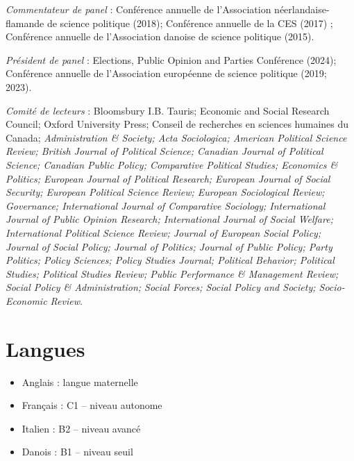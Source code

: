 \documentclass[letterpaper,fontsize=10.5pt]{scrartcl}
\begin{document}
{}\textit{Commentateur de panel} : Conférence annuelle de l'Association néerlandaise-flamande de science politique (2018); Conférence annuelle de la CES (2017) ; Conférence annuelle de l'Association danoise de science politique (2015).\\ 
\hfill \break
{}
{}\textit{Président de panel} : Elections, Public Opinion and Parties Conférence (2024); Conférence annuelle de l'Association européenne de science politique (2019; 2023).\\ 
\hfill \break
{}
{}\textit{Comité de lecteurs} : Bloomsbury I.B. Tauris; Economic and Social Research Council; Oxford University Press; Conseil de recherches en sciences humaines du Canada; \textit{Administration \& Society; Acta Sociologica; American Political Science Review; British Journal of Political Science; Canadian Journal of Political Science; Canadian Public Policy; Comparative Political Studies; Economics \& Politics; European Journal of Political Research; European Journal of Social Security; European Political Science Review; European Sociological Review; Governance; International Journal of Comparative Sociology; International Journal of Public Opinion Research; International Journal of Social Welfare; International Political Science Review; Journal of European Social Policy; Journal of Social Policy; Journal of Politics; Journal of Public Policy; Party Politics; Policy Sciences; Policy Studies Journal; Political Behavior; Political Studies; Political Studies Review; Public Performance \& Management Review; Social Policy \& Administration; Social Forces; Social Policy and Society; Socio-Economic Review}.

\section{Langues}
\begin{itemize}[itemsep=0em, topsep=0em, partopsep=0em]
	\item Anglais : langue maternelle
	\item Français : C1 -- niveau autonome
	\item Italien : B2 -- niveau avancé
	\item Danois : B1 -- niveau seuil \\
\end{itemize}
\end{document}
